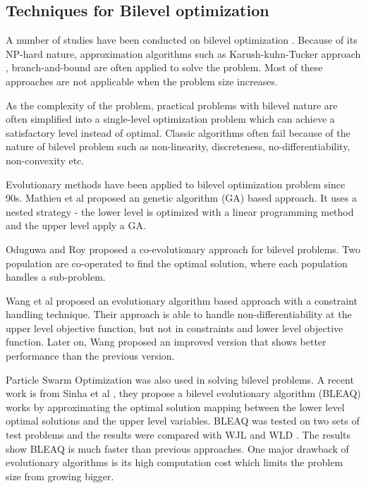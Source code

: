 \subsection{Techniques for Bilevel optimization}

A number of studies have been conducted on bilevel optimization \cite{Colson:2007bu,Dempe:2006jc}. Because of its NP-hard nature, approximation algorithms such as Karush-kuhn-Tucker approach \cite{Bianco:2009ej, Herskovits:2000be}, branch-and-bound \cite{Bard:1982gs} are often applied to solve the problem. Most of these approaches are not applicable when the problem size increases.

As the complexity of the problem, practical problems with bilevel nature are often simplified into a single-level optimization problem which can achieve a satisfactory level instead of optimal. Classic algorithms often fail because of the nature of bilevel problem such as non-linearity, discreteness, no-differentiability, non-convexity etc.


Evolutionary methods have been applied to bilevel optimization problem since 90s. Mathieu et al \cite{Mathieu:1994uh} proposed an genetic algorithm (GA) based approach. It uses a nested strategy - the lower level is optimized with a linear programming method and the upper level apply a GA.

Oduguwa and Roy \cite{Oduguwa:2002kr} proposed a co-evolutionary approach for bilevel problems. Two population are co-operated to find the optimal solution, where each population handles a sub-problem. 

Wang et al \cite{Wang:2005fa} proposed an evolutionary algorithm based approach with a constraint handling technique.  Their approach is able to handle non-differentiability at the upper level objective function, but not in constraints and lower  level objective function.
Later on, Wang proposed an improved version \cite{Wang:2011di} that shows better performance than the previous version.

Particle Swarm Optimization \cite{Li:2006br} was also used in solving bilevel problems.
A recent work is from Sinha et al \cite{Sinha:2013tn}, they propose a bilevel evolutionary algorithm (BLEAQ) works by approximating the optimal solution mapping between the lower level optimal solutions and the upper level variables.  BLEAQ was tested on two sets of test problems and the results were compared with WJL \cite{Wang:2005fa} and WLD \cite{Wang:2011di}. The results show BLEAQ is much faster than previous approaches.
One major drawback of evolutionary algorithms is its high computation cost which limits the problem size from growing bigger.

